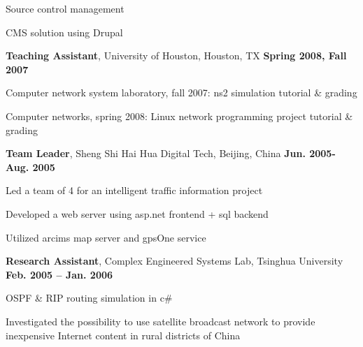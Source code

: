 \documentclass[overlapped, line]{resume}
\begin{document}
\begin{resume}
\begin{list2}
\begin{list2}
           \item Source control management
           \item CMS solution using Drupal
           \end{list2}
         \end{list2}  \vspace{-5pt}
         \clearpage
         {\bf Teaching Assistant}, University of Houston, Houston, TX \hfill {\bf Spring 2008, Fall 2007}\\
         \vspace{-10pt}      %
         \begin{list2}
         \item Computer network system laboratory, fall 2007: ns2 simulation tutorial \& grading
         \item Computer networks, spring 2008: Linux network programming project tutorial \& grading
         \end{list2}  \vspace{-5pt}

         {\bf Team Leader}, Sheng Shi Hai Hua Digital Tech, Beijing, China \hfill {\bf Jun. 2005-Aug. 2005}\\
         \vspace{-10pt}      %
         \begin{list2}
         \item Led a team of 4 for an intelligent traffic information project
         \item Developed a web server using asp.net frontend + sql backend
         \item Utilized arcims map server and gpsOne service
         \end{list2}  \vspace{-5pt}

         {\bf Research Assistant}, Complex Engineered Systems Lab, Tsinghua University \hfill {\bf Feb. 2005 -- Jan. 2006}\\
         \vspace{-10pt}      %
         \begin{list2}
         \item OSPF \& RIP routing simulation in c\#
         \item Investigated the possibility to use satellite broadcast network to provide inexpensive Internet content in rural districts of China
         \end{list2}  \vspace{-5pt}


\end{resume}
\end{document}

